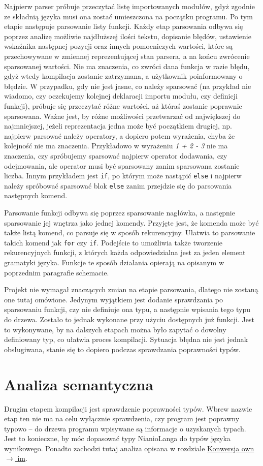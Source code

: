 \documentclass[licencjacka]{pracamgr}
\begin{document}
Najpierw parser próbuje przeczytać listę importowanych modułów, gdyż zgodnie ze składnią języka musi ona zostać umieszczona na początku programu. Po
tym etapie następuje parsowanie listy funkcji. Każdy etap parsowania odbywa się poprzez analizę możliwie najdłuższej ilości tekstu, dopisanie błędów,
ustawienie wskaźnika następnej pozycji oraz innych pomocniczych wartości, które są przechowywane w zmiennej reprezentującej stan parsera, a na końcu
zwrócenie sparsowanej wartości. Nie ma znaczenia, co zwróci dana funkcja w razie błędu, gdyż wtedy kompilacja zostanie zatrzymana, a użytkownik
poinformowany o błędzie. W przypadku, gdy nie jest jasne, co należy sparsować (na przykład nie wiadomo, czy oczekujemy kolejnej deklaracji importu
modułu, czy definicji funkcji), próbuje się przeczytać różne wartości, aż któraś zostanie poprawnie sparsowana. Ważne jest, by różne możliwości
przetwarzać od największej do najmniejszej, jeżeli reprezentacja jedna może być początkiem drugiej, np. najpierw parsować należy operatory, a dopiero
potem wyrażenia, chyba że kolejność nie ma znaczenia. Przykładowo w wyrażeniu \emph{1 + 2 - 3} nie ma znaczenia, czy spróbujemy sparsować najpierw
operator dodawania, czy odejmowania, ale operator musi być sparsowany zanim sparsowana zostanie liczba. Innym przykładem jest \texttt{if}, po którym
może nastąpić \texttt{else} i najpierw należy spróbować sparsować blok \texttt{else} zanim przejdzie się do parsowania następnych komend.

Parsowanie funkcji odbywa się poprzez sparsowanie nagłówka, a następnie sparsowanie jej wnętrza jako jednej komendy. Przyjęte jest, że komenda może
być także listą komend, co parsuje się w sposób rekurencyjny. Ułatwia to parsowanie takich komend jak \texttt{for} czy \texttt{if}. Podejście to
umożliwia także tworzenie rekurencyjnych funkcji, z których każda odpowiedzialna jest za jeden element gramatyki języka. Funkcje te sposób działania
opierają na opisanym w poprzednim paragrafie schemacie.

Projekt nie wymagał znaczących zmian na etapie parsowania, dlatego nie zostaną one tutaj omówione. Jedynym wyjątkiem jest dodanie sprawdzania po
sparsowaniu funkcji, czy nie definiuje ona typu, a następnie wpisania tego typu do drzewa. Zostało to jednak wykonane przy użyciu dostępnych już
funkcji. Jest to wykonywane, by na dalszych etapach można było zapytać o dowolny definiowany typ, co ułatwia proces kompilacji. Sytuacja błędna nie
jest jednak obsługiwana, stanie się to dopiero podczas sprawdzania poprawności typów.
\section{Analiza semantyczna}
Drugim etapem kompilacji jest sprawdzenie poprawności typów. Wbrew nazwie etap ten nie ma na celu wyłącznie sprawdzenia, czy program jest poprawny
typowo -- do drzewa programu wpisywane są informacje o uzyskanych typach. Jest to konieczne, by móc dopasować typy NianioLanga do typów języka
wynikowego. Ponadto zachodzi tutaj analiza opisana w rozdziale \hyperref[sec:own_to_im]{Konwersja own $\rightarrow$ im}.
\end{document}
